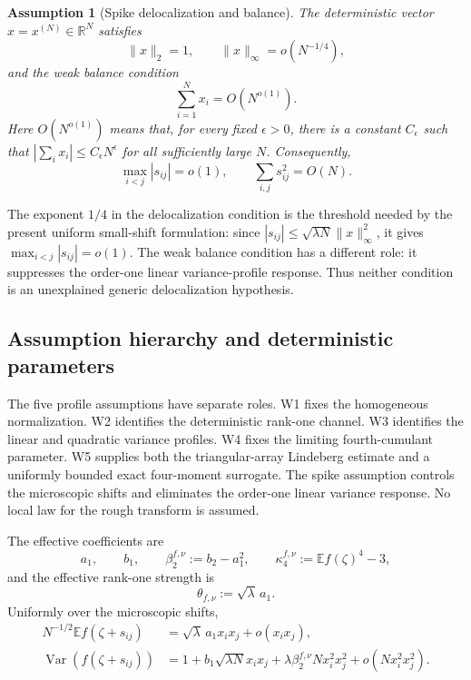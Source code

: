 \documentclass[10pt,a4paper]{amsart}
\newtheorem{assumption}[theorem]{Assumption}
\newcommand{\E}{\mathbb E}
\newcommand{\R}{\mathbb R}
\newcommand{\Var}{\operatorname{Var}}
\begin{document}
\begin{assumption}[Spike delocalization and balance]\label{ass:spike}
The deterministic vector \(x=x^{(N)}\in\R^N\) satisfies
\[
        \|x\|_2=1,
        \qquad
        \|x\|_\infty=o(N^{-1/4}),
\]
and the weak balance condition
\[
        \sum_{i=1}^N x_i=O(N^{o(1)}).
\]
Here \(O(N^{o(1)})\) means that, for every fixed \(\epsilon>0\), there is a
constant \(C_\epsilon\) such that
\(
 |\sum_i x_i|\le C_\epsilon N^\epsilon
\)
for all sufficiently large \(N\).
Consequently,
\[
        \max_{i<j}|s_{ij}|=o(1),
        \qquad
        \sum_{i,j}s_{ij}^2=O(N).
\]
\end{assumption}

The exponent $1/4$ in the delocalization condition is the threshold needed
by the present uniform small-shift formulation: since
$|s_{ij}|\leq\sqrt{\lambda N}\|x\|_\infty^2$, it gives
$\max_{i<j}|s_{ij}|=o(1)$.  The weak balance condition has a different role:
it suppresses the order-one linear variance-profile response.  Thus neither
condition is an unexplained generic delocalization hypothesis.

\subsection{Assumption hierarchy and deterministic parameters}
\label{subsec:assumption-hierarchy}

The five profile assumptions have separate roles.  W1 fixes the homogeneous
normalization.  W2 identifies the deterministic rank-one channel.  W3
identifies the linear and quadratic variance profiles.  W4 fixes the limiting
fourth-cumulant parameter.  W5 supplies both the triangular-array Lindeberg
estimate and a uniformly bounded exact four-moment surrogate.  The spike
assumption controls the microscopic shifts and eliminates the order-one
linear variance response.  No local law for the rough transform is assumed.

The effective coefficients are
\begin{equation}\label{eq:profile-coeffs}
 a_1,\qquad b_1,\qquad
 \beta_2^{f,\nu}:=b_2-a_1^2,\qquad
 \kappa_4^{f,\nu}:=\E f(\zeta)^4-3,
\end{equation}
and the effective rank-one strength is
\begin{equation}\label{eq:theta-nu}
 \theta_{f,\nu}:=\sqrt\lambda\,a_1.
\end{equation}
Uniformly over the microscopic shifts,
\begin{align}
 N^{-1/2}\E f(\zeta+s_{ij})
 &=\sqrt\lambda\,a_1x_ix_j+o(x_ix_j),
 \label{eq:matrix-mean-expansion}\\
 \Var(f(\zeta+s_{ij}))
 &=1+b_1\sqrt{\lambda N}x_ix_j
 +\lambda\beta_2^{f,\nu}Nx_i^2x_j^2
 +o(Nx_i^2x_j^2).
 \label{eq:matrix-variance-profile}
\end{align}
\end{document}
